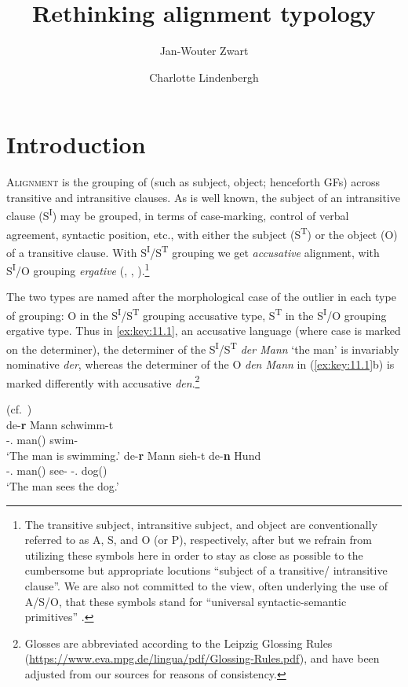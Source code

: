 \documentclass[output=paper]{langsci/langscibook}
\author{Jan-Wouter Zwart\affiliation{University of Groningen}\and Charlotte Lindenbergh\affiliation{University of Groningen}}
\title{Rethinking alignment typology}
\begin{document}
\glsresetall

\section{Introduction}\label{sec:key:11.1}

\textsc{Alignment} is the grouping of  (such as subject,
object; henceforth \glspl{GF}) across transitive and intransitive
clauses. As is well known, the subject of an intransitive clause
(S\textsuperscript{I}) may be grouped, in terms of case-marking, control of
verbal agreement, syntactic position, etc., with either the subject
(S\textsuperscript{T}) or the object (O) of a transitive clause. With
S\textsuperscript{I}/S\textsuperscript{T} grouping we get \emph{accusative}
alignment, with S\textsuperscript{I}/O grouping \emph{ergative} 
(\citealt{Plank1979}, \citealt{Dixon1994}, \citealt{Deal2015}).\footnote{The
    transitive subject, intransitive subject, and object are conventionally
    referred to as A, S, and O (or P), respectively, after
    \textcite[xxiii]{Dixon1972} but we refrain from utilizing these symbols
    here in order to stay as close as possible to the cumbersome but
    appropriate locutions \enquote{subject of a transitive/ intransitive
    clause}. We are also not committed to the view, often underlying the use of
    A/S/O, that these symbols stand for “universal syntactic-semantic
primitives” \citep[6]{Dixon1994}.}

The two  types are named after the morphological case of the outlier
in each type of grouping: O in the S\textsuperscript{I}/S\textsuperscript{T}
grouping accusative type, S\textsuperscript{T} in the S\textsuperscript{I}/O
grouping ergative type. Thus in  \eqref{ex:key:11.1}, an accusative language (where case
is marked on the determiner), the determiner of the
S\textsuperscript{I}/S\textsuperscript{T} \emph{der Mann} ‘the man’ is
invariably nominative \emph{der}, whereas the determiner of the O \emph{den
    Mann} in (\ref{ex:key:11.1}b) is marked differently with accusative
    \emph{den}.\footnote{Glosses are abbreviated according to the Leipzig
        Glossing Rules
        (\url{https://www.eva.mpg.de/lingua/pdf/Glossing-Rules.pdf}), and have
    been adjusted from our sources for reasons of consistency.}

\ea%
    \label{ex:key:11.1} ({cf.\ \citealt{Curme1952}})\\
	\ea
		\gll de-\textbf{r}        Mann    schwimm-t\\
			\Det-\M.\Nom{}  man(\M)  swim-\Tsg{}\\
		\glt ‘The man is swimming.’
	\ex
		\gll de-\textbf{r}        Mann    sieh-t  de-\textbf{n}      Hund\\
			\Det-\M.\Nom{}  man(\M)  see-\Tsg{} \Det-\glossN.\Acc{}  dog(\glossN)\\
		\glt ‘The man sees the dog.’
	\z
\z
\end{document}

